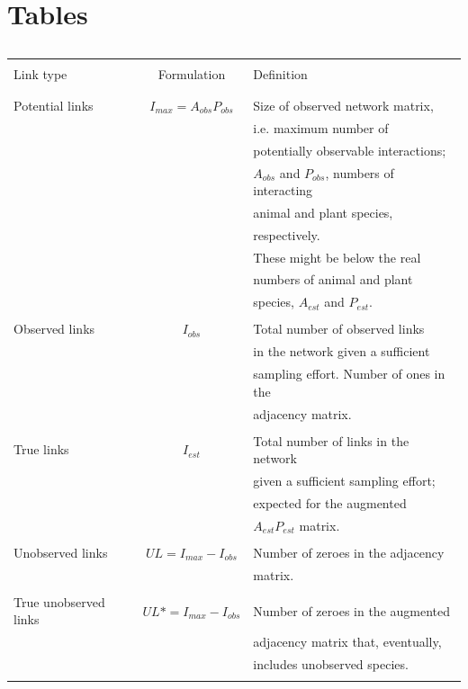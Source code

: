 \documentclass[12pt]{article}
\begin{document}
\section*{Tables}
\begin{table}[ht!]
  \caption{}
  \label{Table_1}
  \begin{center}
		\begin{tabular}{lcl}
      \hline
\\Link type   &  Formulation   &   Definition\\\\
      \hline
\\Potential links&$I_{max}= A_{obs}P_{obs}$&Size of observed network matrix,  \\ && i.e. maximum number of \\ && potentially observable interactions;  \\ && $A_{obs}$ and $P_{obs}$, numbers of interacting  \\ && animal and plant species, \\ &&  respectively. \\&& These might be below the real  \\ && numbers of animal and plant \\ &&  species, $A_{est}$ and $P_{est}$.\\\\
Observed links&$I_{obs}$&Total number of observed links  \\ && in the network given a sufficient \\ &&  sampling effort. Number of ones in the  \\ && adjacency matrix.\\\\
True links&$I_{est}$&Total number of links in the network \\ &&  given a sufficient sampling effort;  \\ && expected for the augmented \\ &&  $A_{est}P_{est}$ matrix. \\\\
Unobserved links&$UL= I_{max} - I_{obs}$&Number of zeroes in the  adjacency \\ && matrix.\\\\
True unobserved links&$UL*= I_{max} - I_{obs}$&Number of zeroes in the augmented \\ &&  adjacency matrix that, eventually,  \\ &&  includes unobserved species.\\\\

\end{tabular}
\end{center}
\end{table}
\end{document}
